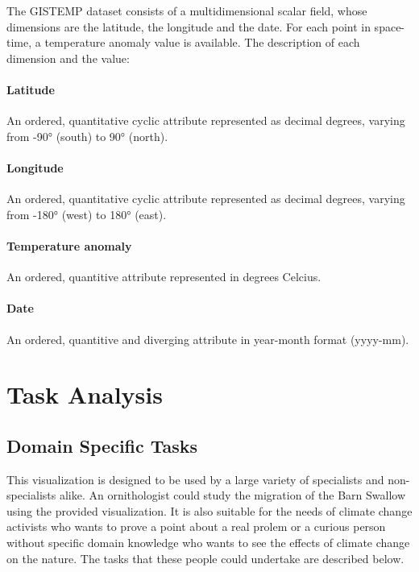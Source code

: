 \documentclass[journal]{vgtc}                %
\begin{document}
\vspace{2mm}

The GISTEMP dataset \cite{gistemp} consists of a multidimensional scalar field, whose dimensions are the latitude, the longitude and the date. For each point in space-time, a temperature anomaly value is available. The description of each dimension and the value:

\paragraph{Latitude} An ordered, quantitative cyclic attribute represented as decimal degrees, varying from -90° (south) to 90° (north).

\paragraph{Longitude} An ordered, quantitative cyclic attribute represented as decimal degrees, varying from -180° (west) to 180° (east).

\paragraph{Temperature anomaly} An ordered, quantitive attribute represented in degrees Celcius.

\paragraph{Date} An ordered, quantitive and diverging attribute in year-month format (yyyy-mm).

\section{Task Analysis}

\subsection{Domain Specific Tasks}
This visualization is designed to be used by a large variety of specialists and non-specialists alike. An ornithologist could study the migration of the Barn Swallow using the provided visualization. It is also suitable for the needs of climate  change activists who wants to prove a point about a real prolem or a curious person without specific domain knowledge who wants to see the effects of climate change on the nature. The tasks that  these people could undertake are described below.
\end{document}
